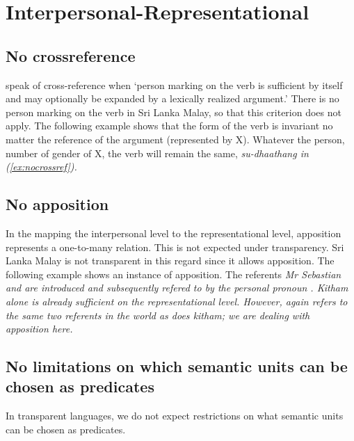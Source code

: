 \documentclass[a4paper]{article}
\begin{document}
\section{Interpersonal-Representational}

\subsection{No crossreference}\label{sec:crossref}
\citet[350]{HengeveldEtAl2008fdg} speak of cross-reference when `person marking on the verb is sufficient by itself and may optionally be expanded by a lexically realized argument.' There is no person marking on the verb in Sri Lanka Malay, so that this criterion does not apply. The following example shows that the form of the verb is invariant no matter the reference of the argument (represented by X). Whatever the person, number of gender of X, the verb will remain the same, \em su-dhaathang \em in (\ref{ex:nocrossref}).


\subsection{No apposition}
In the mapping  the interpersonal level to the representational level, apposition represents a one-to-many relation. This is not expected under transparency. Sri Lanka Malay is not transparent in this regard since it allows apposition. The following example shows an instance of apposition. The referents \em Mr Sebastian \em  and   are introduced and subsequently refered to by the personal pronoun . \em Kitham \em alone is already sufficient on the representational level. However,  again refers to the same two referents in the world as does \em kitham\em; we are dealing with apposition here.



\subsection{No limitations on which semantic units can be chosen as predicates}
In transparent languages, we do not expect  restrictions on what semantic units can be chosen as predicates.
\end{document}
